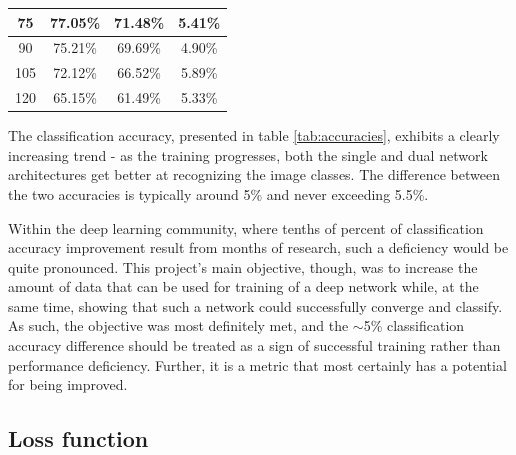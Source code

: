 \documentclass[a4paper, 12pt]{article}
\numberwithin{equation}{section}
\begin{document}
\begin{table}[ht!]
\begin{tabular}{|c|c|c|c|}
			75                                                         & 77.05\%                                                           & 71.48\%                                                         & 5.41\%                                                                           \\ \hline
			90                                                         & 75.21\%                                                           & 69.69\%                                                         & 4.90\%                                                                           \\ \hline
			105                                                        & 72.12\%                                                           & 66.52\%                                                         & 5.89\%                                                                           \\ \hline
			120                                                        & 65.15\%                                                           & 61.49\%                                                         & 5.33\%                                                                           \\ \hline
		\end{tabular}
	\end{table}

	The classification accuracy, presented in table \ref{tab:accuracies}, exhibits a clearly increasing trend - as the training progresses, both the single and dual network architectures get better at recognizing the image classes. The difference between the two accuracies is typically around 5\% and never exceeding 5.5\%.
	
	Within the deep learning community, where tenths of percent of classification accuracy improvement result from months of research, such a deficiency would be quite pronounced. This project's main objective, though, was to increase the amount of data that can be used for training of a deep network while, at the same time, showing that such a network could successfully converge and classify. As such, the objective was most definitely met, and the $\mathtt{\sim}$5\% classification accuracy difference should be treated as a sign of successful training rather than performance deficiency. Further, it is a metric that most certainly has a potential for being improved.
		
	\subsection{Loss function}
	
\end{document}
